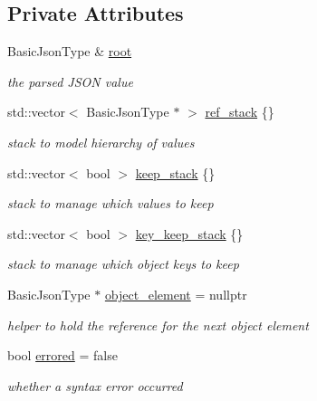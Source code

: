 \subsection*{Private Attributes}
\begin{DoxyCompactItemize}
\item 
Basic\+Json\+Type \& \hyperlink{classnlohmann_1_1detail_1_1json__sax__dom__callback__parser_a7b12037ca38be3ddec09c42bd71080cc}{root}
\begin{DoxyCompactList}\small\item\em the parsed J\+S\+ON value \end{DoxyCompactList}\item 
std\+::vector$<$ Basic\+Json\+Type $\ast$ $>$ \hyperlink{classnlohmann_1_1detail_1_1json__sax__dom__callback__parser_a82a0e49479660b9903597e1ef55c6601}{ref\+\_\+stack} \{\}
\begin{DoxyCompactList}\small\item\em stack to model hierarchy of values \end{DoxyCompactList}\item 
std\+::vector$<$ bool $>$ \hyperlink{classnlohmann_1_1detail_1_1json__sax__dom__callback__parser_ac24fd6c9f1b31b44328c16d65755ae76}{keep\+\_\+stack} \{\}
\begin{DoxyCompactList}\small\item\em stack to manage which values to keep \end{DoxyCompactList}\item 
std\+::vector$<$ bool $>$ \hyperlink{classnlohmann_1_1detail_1_1json__sax__dom__callback__parser_a8f0e96e8bc4f692169024105693f5706}{key\+\_\+keep\+\_\+stack} \{\}
\begin{DoxyCompactList}\small\item\em stack to manage which object keys to keep \end{DoxyCompactList}\item 
Basic\+Json\+Type $\ast$ \hyperlink{classnlohmann_1_1detail_1_1json__sax__dom__callback__parser_a2a8adecd936ba6ec187f1216241b508f}{object\+\_\+element} = nullptr
\begin{DoxyCompactList}\small\item\em helper to hold the reference for the next object element \end{DoxyCompactList}\item 
bool \hyperlink{classnlohmann_1_1detail_1_1json__sax__dom__callback__parser_ab06baaa640cfaae5846daa7c3594b116}{errored} = false
\begin{DoxyCompactList}\small\item\em whether a syntax error occurred \end{DoxyCompactList}\item 

\end{DoxyCompactItemize}
